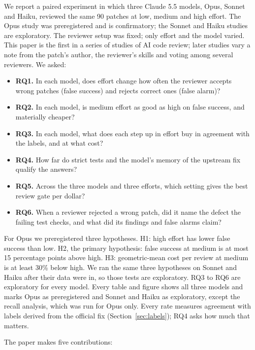 \documentclass[sigconf,nonacm]{acmart}
\begin{document}
We report a paired experiment in which three Claude 5.5 models, Opus, Sonnet and Haiku, reviewed the same 90 patches at low, medium and high effort. The Opus study was preregistered and is confirmatory; the Sonnet and Haiku studies are exploratory. The reviewer setup was fixed; only effort and the model varied. This paper is the first in a series of studies of AI code review; later studies vary a note from the patch's author, the reviewer's skills and voting among several reviewers. We asked:

\begin{itemize}
\item \textbf{RQ1.} In each model, does effort change how often the reviewer accepts wrong patches (false success) and rejects correct ones (false alarm)?
\item \textbf{RQ2.} In each model, is medium effort as good as high on false success, and materially cheaper?
\item \textbf{RQ3.} In each model, what does each step up in effort buy in agreement with the labels, and at what cost?
\item \textbf{RQ4.} How far do strict tests and the model's memory of the upstream fix qualify the answers?
\item \textbf{RQ5.} Across the three models and three efforts, which setting gives the best review gate per dollar?
\item \textbf{RQ6.} When a reviewer rejected a wrong patch, did it name the defect the failing test checks, and what did its findings and false alarms claim?
\end{itemize}

For Opus we preregistered three hypotheses. H1: high effort has lower false success than low. H2, the primary hypothesis: false success at medium is at most 15 percentage points above high. H3: geometric-mean cost per review at medium is at least 30\% below high. We ran the same three hypotheses on Sonnet and Haiku after their data were in, so those tests are exploratory. RQ3 to RQ6 are exploratory for every model. Every table and figure shows all three models and marks Opus as preregistered and Sonnet and Haiku as exploratory, except the recall analysis, which was run for Opus only. Every rate measures agreement with labels derived from the official fix (Section~\ref{sec:labels}); RQ4 asks how much that matters.

The paper makes five contributions:
\end{document}

